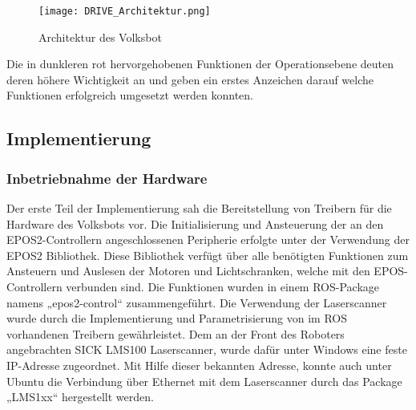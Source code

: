 \begin{figure}[h!]
 \centering
		\texttt{[image: DRIVE\_Architektur.png]}
	\caption{Architektur des Volksbot}
	\label{fig:architecture_volksbot}
\end{figure}

Die in dunkleren rot hervorgehobenen Funktionen der Operationsebene deuten deren höhere Wichtigkeit an und geben ein erstes Anzeichen darauf welche Funktionen erfolgreich umgesetzt werden konnten.

\subsection{Implementierung}

\subsubsection{Inbetriebnahme der Hardware}
Der erste Teil der Implementierung sah die Bereitstellung von Treibern für die Hardware des Volksbots vor. Die Initialisierung und Ansteuerung der an den EPOS2-Controllern angeschlossenen Peripherie erfolgte unter der Verwendung der EPOS2 Bibliothek. Diese Bibliothek verfügt über alle benötigten Funktionen zum Ansteuern und Auslesen der Motoren und Lichtschranken, welche mit den EPOS-Controllern verbunden sind. Die Funktionen wurden in einem ROS-Package namens „epos2-control“ zusammengeführt.
Die Verwendung der Laserscanner wurde durch die Implementierung und Parametrisierung von im ROS vorhandenen Treibern gewährleistet. Dem an der Front des Roboters angebrachten SICK LMS100 Laserscanner, wurde dafür unter Windows eine feste IP-Adresse zugeordnet. Mit Hilfe dieser bekannten Adresse, konnte auch unter Ubuntu die Verbindung über Ethernet mit dem Laserscanner durch das Package „LMS1xx“  hergestellt werden.


